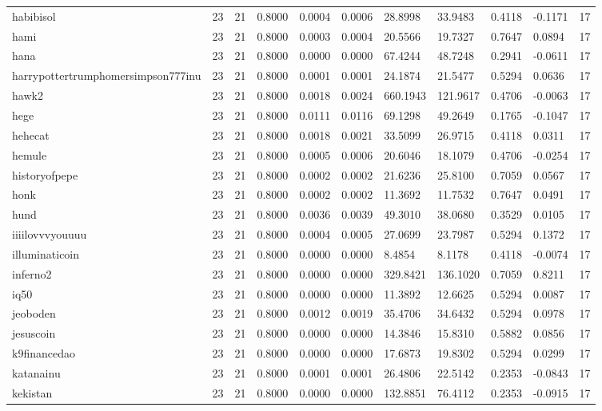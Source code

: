 \begin{table}[htbp]
\begin{tabular}{lllllllllll}
habibisol & 23 & 21 & 0.8000 & 0.0004 & 0.0006 & 28.8998 & 33.9483 & 0.4118 & -0.1171 & 17 \\
hami & 23 & 21 & 0.8000 & 0.0003 & 0.0004 & 20.5566 & 19.7327 & 0.7647 & 0.0894 & 17 \\
hana & 23 & 21 & 0.8000 & 0.0000 & 0.0000 & 67.4244 & 48.7248 & 0.2941 & -0.0611 & 17 \\
harrypottertrumphomersimpson777inu & 23 & 21 & 0.8000 & 0.0001 & 0.0001 & 24.1874 & 21.5477 & 0.5294 & 0.0636 & 17 \\
hawk2 & 23 & 21 & 0.8000 & 0.0018 & 0.0024 & 660.1943 & 121.9617 & 0.4706 & -0.0063 & 17 \\
hege & 23 & 21 & 0.8000 & 0.0111 & 0.0116 & 69.1298 & 49.2649 & 0.1765 & -0.1047 & 17 \\
hehecat & 23 & 21 & 0.8000 & 0.0018 & 0.0021 & 33.5099 & 26.9715 & 0.4118 & 0.0311 & 17 \\
hemule & 23 & 21 & 0.8000 & 0.0005 & 0.0006 & 20.6046 & 18.1079 & 0.4706 & -0.0254 & 17 \\
historyofpepe & 23 & 21 & 0.8000 & 0.0002 & 0.0002 & 21.6236 & 25.8100 & 0.7059 & 0.0567 & 17 \\
honk & 23 & 21 & 0.8000 & 0.0002 & 0.0002 & 11.3692 & 11.7532 & 0.7647 & 0.0491 & 17 \\
hund & 23 & 21 & 0.8000 & 0.0036 & 0.0039 & 49.3010 & 38.0680 & 0.3529 & 0.0105 & 17 \\
iiiilovvvyouuuu & 23 & 21 & 0.8000 & 0.0004 & 0.0005 & 27.0699 & 23.7987 & 0.5294 & 0.1372 & 17 \\
illuminaticoin & 23 & 21 & 0.8000 & 0.0000 & 0.0000 & 8.4854 & 8.1178 & 0.4118 & -0.0074 & 17 \\
inferno2 & 23 & 21 & 0.8000 & 0.0000 & 0.0000 & 329.8421 & 136.1020 & 0.7059 & 0.8211 & 17 \\
iq50 & 23 & 21 & 0.8000 & 0.0000 & 0.0000 & 11.3892 & 12.6625 & 0.5294 & 0.0087 & 17 \\
jeoboden & 23 & 21 & 0.8000 & 0.0012 & 0.0019 & 35.4706 & 34.6432 & 0.5294 & 0.0978 & 17 \\
jesuscoin & 23 & 21 & 0.8000 & 0.0000 & 0.0000 & 14.3846 & 15.8310 & 0.5882 & 0.0856 & 17 \\
k9financedao & 23 & 21 & 0.8000 & 0.0000 & 0.0000 & 17.6873 & 19.8302 & 0.5294 & 0.0299 & 17 \\
katanainu & 23 & 21 & 0.8000 & 0.0001 & 0.0001 & 26.4806 & 22.5142 & 0.2353 & -0.0843 & 17 \\
kekistan & 23 & 21 & 0.8000 & 0.0000 & 0.0000 & 132.8851 & 76.4112 & 0.2353 & -0.0915 & 17 \\

\end{tabular}
\end{table}
